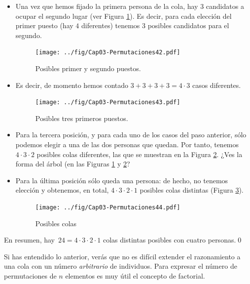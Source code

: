 \begin{Ejemplo}
\begin{itemize}
        \item Una vez que hemos fijado la primera persona de la cola, hay 3 candidatos a ocupar el segundo lugar (ver Figura \ref{cap03:fig:arbol2}). Es decir, para cada elecci\'on del primer puesto (hay $4$ diferentes) tenemos 3 posibles candidatos para el segundo.
        	\begin{center}
            \begin{figure}[h!]	
            \texttt{[image: ../fig/Cap03-Permutaciones42.pdf]}
            \caption{Posibles primer y segundo puestos.}\label{cap03:fig:arbol2}
            \end{figure}
            \end{center}
        \item Es decir, de momento hemos contado $3+3+3+3=4\cdot 3$ casos diferentes.
            \begin{center}
            \begin{figure}[h!]	
            \texttt{[image: ../fig/Cap03-Permutaciones43.pdf]}
            \caption{Posibles tres primeros puestos.}\label{cap03:fig:arbol3}
            \end{figure}
            \end{center}
        \item Para la tercera posici\'on, y para cada uno de los casos del paso anterior, s\'olo podemos elegir a una de las dos personas que quedan. Por tanto, tenemos $4\cdot 3\cdot 2$ posibles colas diferentes, las que se muestran en la Figura \ref{cap03:fig:arbol3}. ¿Ves la forma del \'arbol (en las Figuras \ref{cap03:fig:arbol2} y \ref{cap03:fig:arbol3}?
        \item Para la \'ultima posici\'on s\'olo queda una persona: de hecho, no tenemos elección y obtenemos, en total, $4\cdot 3\cdot 2\cdot 1$ posibles colas distintas (Figura \ref{cap03:fig:arbol4}).
    		\begin{center}
            \begin{figure}[h!]	
            \texttt{[image: ../fig/Cap03-Permutaciones44.pdf]}
            \caption{Posibles colas}\label{cap03:fig:arbol4}
            \end{figure}
            \end{center}
    \end{itemize}
    En resumen, hay\, $24=4\cdot 3\cdot 2\cdot 1$ colas distintas posibles con cuatro personas.\qed
    \end{Ejemplo}
Si has entendido lo anterior, verás que no es dif\'icil extender el razonamiento a una cola con un n\'umero {\em arbitrario} de individuos. Para expresar el número de permutaciones de $n$ elementos es muy \'util el concepto de {\sf factorial}.
